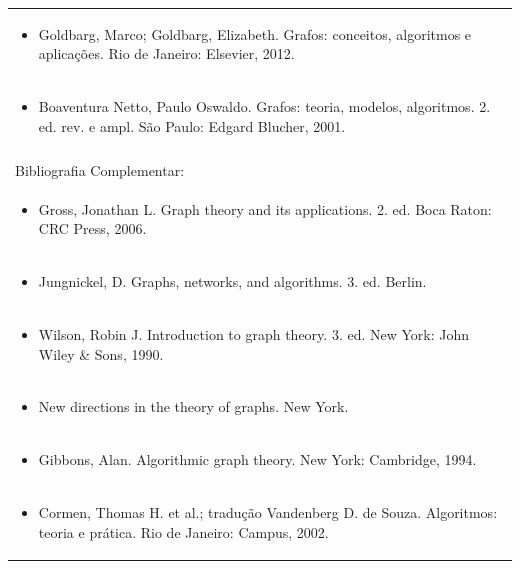 \documentclass[11pt]{article}
\begin{document}
\begin{center}
\begin{longtable}{|p{4cm}|p{4cm}|p{4cm}|p{4cm}|}
\multicolumn{4}{|p{\dimexpr 16cm + 6\tabcolsep\relax}|}{\begin{itemize}\item Goldbarg, Marco; Goldbarg, Elizabeth. Grafos: conceitos, algoritmos e aplicações. Rio de Janeiro: Elsevier, 2012.\end{itemize}}\\
\multicolumn{4}{|p{\dimexpr 16cm + 6\tabcolsep\relax}|}{\begin{itemize}\item Boaventura Netto, Paulo Oswaldo. Grafos: teoria, modelos, algoritmos. 2. ed. rev. e ampl. São Paulo: Edgard Blucher, 2001.\end{itemize}}\\
\multicolumn{4}{|p{16cm}|}{}\\
\hline
\multicolumn{4}{|p{16cm}|}{Bibliografia Complementar:}\\*
\multicolumn{4}{|p{\dimexpr 16cm + 6\tabcolsep\relax}|}{\begin{itemize}\item Gross, Jonathan L. Graph theory and its applications. 2. ed. Boca Raton: CRC Press, 2006.\end{itemize}}\\
\multicolumn{4}{|p{\dimexpr 16cm + 6\tabcolsep\relax}|}{\begin{itemize}\item Jungnickel, D. Graphs, networks, and algorithms. 3. ed. Berlin.\end{itemize}}\\
\multicolumn{4}{|p{\dimexpr 16cm + 6\tabcolsep\relax}|}{\begin{itemize}\item Wilson, Robin J. Introduction to graph theory. 3. ed. New York: John Wiley \& Sons, 1990.\end{itemize}}\\
\multicolumn{4}{|p{\dimexpr 16cm + 6\tabcolsep\relax}|}{\begin{itemize}\item New directions in the theory of graphs. New York.\end{itemize}}\\
\multicolumn{4}{|p{\dimexpr 16cm + 6\tabcolsep\relax}|}{\begin{itemize}\item Gibbons, Alan. Algorithmic graph theory. New York: Cambridge, 1994.\end{itemize}}\\
\multicolumn{4}{|p{\dimexpr 16cm + 6\tabcolsep\relax}|}{\begin{itemize}\item Cormen, Thomas H. et al.; tradução Vandenberg D. de Souza. Algoritmos: teoria e prática. Rio de Janeiro: Campus, 2002.\end{itemize}}\\
\hline
\end{longtable}
\end{center}
\end{document}
